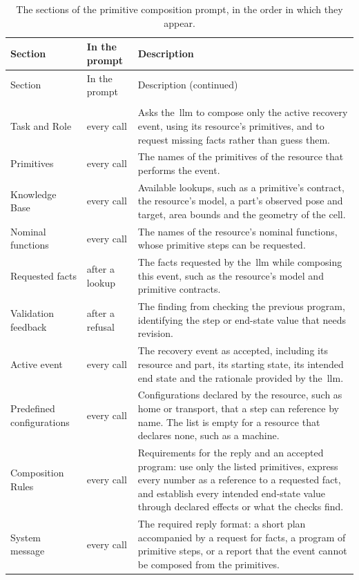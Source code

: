 {\footnotesize\setlength{\tabcolsep}{5pt}
\begin{xltabular}{\linewidth}{@{}>{\raggedright\arraybackslash}p{4.4cm} >{\raggedright\arraybackslash}p{2.4cm} Y@{}}
\toprule
Section & In the prompt & Description \\
\midrule
\endfirsthead
\toprule
Section & In the prompt & Description (continued) \\
\midrule
\endhead
\bottomrule
\endfoot
\bottomrule
\caption{The sections of the primitive composition prompt, in the order in which they appear.}\label{tab:composition-sections}\\
\endlastfoot
Task and Role & every call & Asks the~\gls{llm} to compose only the active recovery event, using its resource's primitives, and to request missing facts rather than guess them. \\
Primitives & every call & The names of the primitives of the resource that performs the event. \\
Knowledge Base & every call & Available lookups, such as a primitive's contract, the resource's model, a part's observed pose and target, area bounds and the geometry of the cell. \\
Nominal functions & every call & The names of the resource's nominal functions, whose primitive steps can be requested. \\
Requested facts & after a lookup & The facts requested by the~\gls{llm} while composing this event, such as the resource's model and primitive contracts. \\
Validation feedback & after a refusal & The finding from checking the previous program, identifying the step or end-state value that needs revision. \\
Active event & every call & The recovery event as accepted, including its resource and part, its starting state, its intended end state and the rationale provided by the~\gls{llm}. \\
Predefined configurations & every call & Configurations declared by the resource, such as home or transport, that a step can reference by name. The list is empty for a resource that declares none, such as a machine. \\
Composition Rules & every call & Requirements for the reply and an accepted program: use only the listed primitives, express every number as a reference to a requested fact, and establish every intended end-state value through declared effects or what the checks find. \\
System message & every call & The required reply format: a short plan accompanied by a request for facts, a program of primitive steps, or a report that the event cannot be composed from the primitives. \\
\end{xltabular}}
